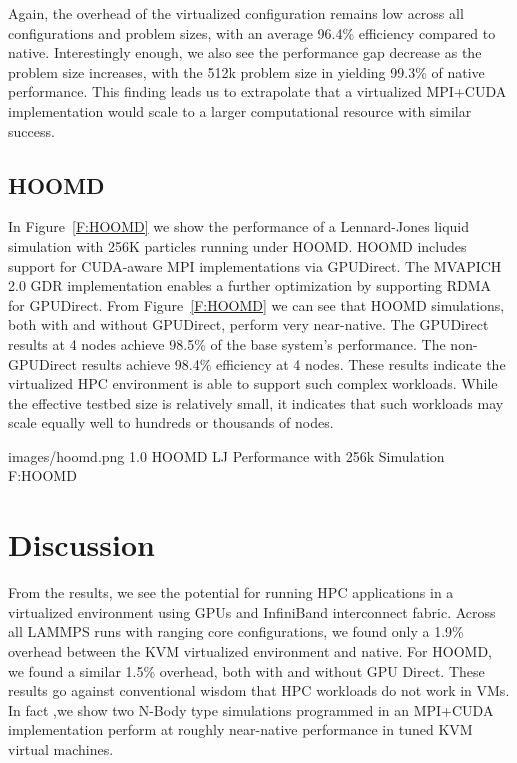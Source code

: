Again, the overhead of the virtualized configuration remains low across all configurations and problem sizes, with an average 96.4\% efficiency compared to native. Interestingly enough, we also see the performance gap decrease as the problem size increases, with the 512k problem size in yielding 99.3\% of native performance.  This finding leads us to extrapolate that a virtualized MPI+CUDA implementation would scale to a larger computational resource with similar success. 


\subsection{HOOMD}






In Figure~\ref{F:HOOMD} we show the performance of a Lennard-Jones liquid simulation with 256K particles running under HOOMD.  HOOMD includes support for CUDA-aware MPI implementations via GPUDirect.  The MVAPICH 2.0 GDR implementation enables a further optimization by supporting RDMA for GPUDirect. From Figure~\ref{F:HOOMD} we can see that HOOMD simulations, both with and without GPUDirect, perform very near-native.  The GPUDirect results at 4 nodes achieve 98.5\% of the base system's performance.  The non-GPUDirect results achieve 98.4\% efficiency at 4 nodes. These results indicate the virtualized HPC environment is able to support such complex workloads. While the effective testbed size is relatively small, it indicates that such workloads may scale equally well to hundreds or thousands of nodes. 

  {images/hoomd.png}
  {1.0}
  {HOOMD LJ Performance with 256k Simulation}
  {F:HOOMD}


\section{Discussion}

From the results, we see the potential for running HPC applications in a virtualized environment using GPUs and InfiniBand interconnect fabric. Across all LAMMPS runs with ranging core configurations, we found only a 1.9\% overhead between the KVM virtualized environment and native. For HOOMD, we found a similar 1.5\% overhead, both with and without GPU Direct. These results go against conventional wisdom that HPC workloads do not work in VMs. In fact ,we show two N-Body type simulations programmed in an MPI+CUDA implementation perform at roughly near-native performance in tuned KVM virtual machines.  


